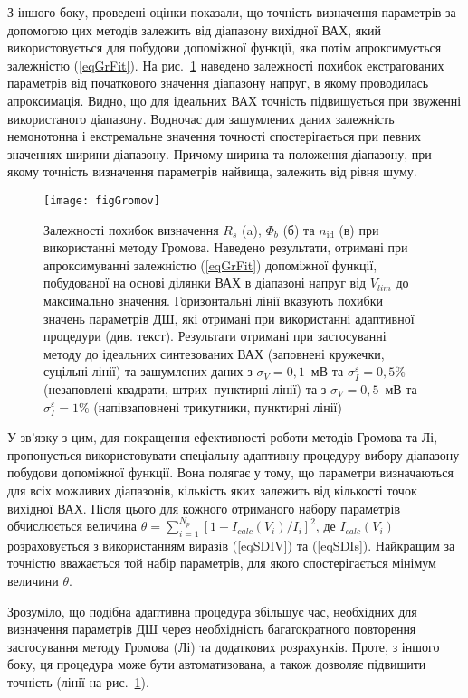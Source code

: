З іншого боку, проведені оцінки показали, що точність визначення параметрів за допомогою цих методів залежить від діапазону вихідної ВАХ, який використовується для побудови допоміжної функції, яка потім апроксимується залежністю (\ref{eqGrFit}).
На рис.~\ref{figGromov} наведено залежності похибок екстрагованих параметрів від початкового значення діапазону напруг, в якому проводилась апроксимація.
Видно, що для ідеальних ВАХ точність підвищується при звуженні використаного діапазону.
Водночас для зашумлених даних залежність немонотонна і екстремальне значення точності спостерігається при певних значеннях ширини діапазону.
Причому ширина та положення діапазону, при якому точність визначення параметрів найвища, залежить від рівня шуму.



\begin{figure}
\center
\texttt{[image: figGromov]}%
\caption{\label{figGromov}
Залежності похибок визначення $R_s$ (a), $\Phi_b$ (б) та $n_\mathrm{id}$ (в) при використанні методу Громова.
Наведено результати, отримані при апроксимуванні залежністю (\ref{eqGrFit}) допоміжної функції, побудованої
на основі ділянки ВАХ в діапазоні напруг від $V_{lim}$ до максимально значення.
Горизонтальні лінії вказують похибки значень параметрів ДШ, які отримані при використанні адаптивної процедури (див. текст).
Результати отримані при застосуванні методу до ідеальних синтезованих ВАХ (заповнені кружечки, суцільні лінії) та зашумлених даних
з $\sigma_V=0,1$~мВ та $\sigma_I^\varepsilon=0,5\%$ (незаповлені квадрати, штрих--пунктирні лінії) та з $\sigma_V=0,5$~мВ та $\sigma_I^\varepsilon=1\%$
(напівзаповнені трикутники, пунктирні лінії)
}
\end{figure}

У зв'язку з цим, для покращення ефективності роботи методів Громова та Лі, пропонується використовувати спеціальну адаптивну процедуру вибору діапазону побудови допоміжної функції.
Вона полягає у тому, що параметри визначаються для всіх можливих діапазонів, кількість яких залежить від кількості точок вихідної ВАХ.
Після цього для кожного отриманого набору параметрів обчислюється величина $\theta=\sum_{i=1}^{N_p}[1-I_{calc}(V_i)/I_i]^2$,
де $I_{calc}(V_i)$ розраховується з використанням виразів (\ref{eqSDIV}) та (\ref{eqSDIs}).
Найкращим за точністю вважається той набір параметрів, для якого спостерігається мінімум величини $\theta$.

Зрозуміло, що подібна адаптивна процедура збільшує час, необхідних для визначення параметрів ДШ через необхідність багатократного повторення застосування методу Громова (Лі) та додаткових розрахунків.
Проте, з іншого боку, ця процедура може бути автоматизована, а також дозволяє підвищити точність (лінії на рис.~\ref{figGromov}).

